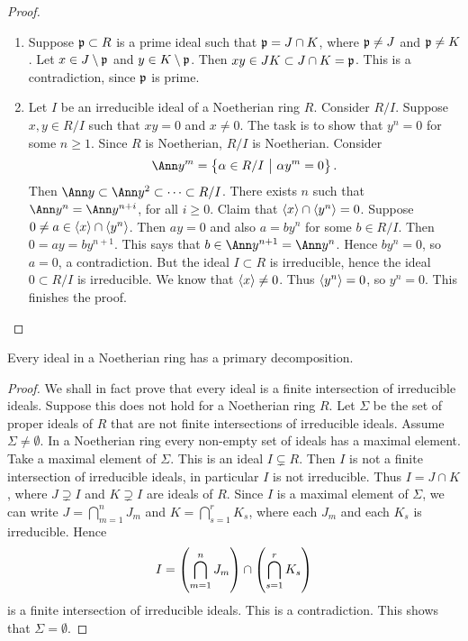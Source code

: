 \begin{proof}
\hfill
\begin{enumerate}
\item Suppose $ \mathfrak{p} \subset R $ is a prime ideal such that $ \mathfrak{p} = J \cap K $, where $ \mathfrak{p} \ne J $ and $ \mathfrak{p} \ne K $. Let $ x \in J \setminus \mathfrak{p} $ and $ y \in K \setminus \mathfrak{p} $. Then $ xy \in JK \subset J \cap K = \mathfrak{p} $. This is a contradiction, since $ \mathfrak{p} $ is prime.
\item Let $ I $ be an irreducible ideal of a Noetherian ring $ R $. Consider $ R / I $. Suppose $ x, y \in R / I $ such that $ xy = 0 $ and $ x \ne 0 $. The task is to show that $ y^n = 0 $ for some $ n \ge 1 $. Since $ R $ is Noetherian, $ R / I $ is Noetherian. Consider
$$ \Ann y^m = \cbr{\alpha \in R / I \st \alpha y^m = 0}. $$
Then $ \Ann y \subset \Ann y^2 \subset \dots \subset R / I $. There exists $ n $ such that $ \Ann y^n = \Ann y^{n + i} $, for all $ i \ge 0 $. Claim that $ \left\langle x \right\rangle \cap \left\langle y^n \right\rangle = 0 $. Suppose $ 0 \ne a \in \left\langle x \right\rangle \cap \left\langle y^n \right\rangle $. Then $ ay = 0 $ and also $ a = by^n $ for some $ b \in R / I $. Then $ 0 = ay = by^{n + 1} $. This says that $ b \in \Ann y^{n + 1} = \Ann y^n $. Hence $ by^n = 0 $, so $ a = 0 $, a contradiction. But the ideal $ I \subset R $ is irreducible, hence the ideal $ 0 \subset R / I $ is irreducible. We know that $ \left\langle x \right\rangle \ne 0 $. Thus $ \left\langle y^n \right\rangle = 0 $, so $ y^n = 0 $. This finishes the proof.
\end{enumerate}
\end{proof}


\begin{theorem}[Noether]
Every ideal in a Noetherian ring has a primary decomposition.
\end{theorem}

\begin{proof}
We shall in fact prove that every ideal is a finite intersection of irreducible ideals. Suppose this does not hold for a Noetherian ring $ R $. Let $ \Sigma $ be the set of proper ideals of $ R $ that are not finite intersections of irreducible ideals. Assume $ \Sigma \ne \emptyset $. In a Noetherian ring every non-empty set of ideals has a maximal element. Take a maximal element of $ \Sigma $. This is an ideal $ I \subsetneq R $. Then $ I $ is not a finite intersection of irreducible ideals, in particular $ I $ is not irreducible. Thus $ I = J \cap K $, where $ J \supsetneq I $ and $ K \supsetneq I $ are ideals of $ R $. Since $ I $ is a maximal element of $ \Sigma $, we can write $ J = \bigcap_{m = 1}^n J_m $ and $ K = \bigcap_{s = 1}^r K_s $, where each $ J_m $ and each $ K_s $ is irreducible. Hence
$$ I = \br{\bigcap_{m = 1}^n J_m} \cap \br{\bigcap_{s = 1}^r K_s} $$
is a finite intersection of irreducible ideals. This is a contradiction. This shows that $ \Sigma = \emptyset $.
\end{proof}

